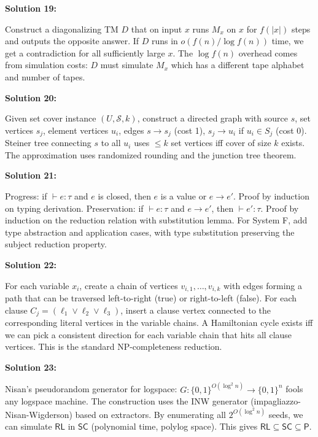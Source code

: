 \documentclass[12pt,a4paper]{exam}
\begin{document}
\vspace{0.5cm}

\textbf{Solution 19:}

Construct a diagonalizing TM $D$ that on input $x$ runs $M_x$ on $x$ for $f(|x|)$ steps and outputs the opposite answer. If $D$ runs in $o(f(n)/\log f(n))$ time, we get a contradiction for all sufficiently large $x$. The $\log f(n)$ overhead comes from simulation costs: $D$ must simulate $M_x$ which has a different tape alphabet and number of tapes.

\vspace{0.5cm}

\textbf{Solution 20:}

Given set cover instance $(U,\mathcal{S},k)$, construct a directed graph with source $s$, set vertices $s_j$, element vertices $u_i$, edges $s \to s_j$ (cost 1), $s_j \to u_i$ if $u_i \in S_j$ (cost 0). Steiner tree connecting $s$ to all $u_i$ uses $\leq k$ set vertices iff cover of size $k$ exists. The approximation uses randomized rounding and the junction tree theorem.

\vspace{0.5cm}

\textbf{Solution 21:}

Progress: if $\vdash e: \tau$ and $e$ is closed, then $e$ is a value or $e \to e'$. Proof by induction on typing derivation. Preservation: if $\vdash e: \tau$ and $e \to e'$, then $\vdash e': \tau$. Proof by induction on the reduction relation with substitution lemma. For System F, add type abstraction and application cases, with type substitution preserving the subject reduction property.

\vspace{0.5cm}

\textbf{Solution 22:}

For each variable $x_i$, create a chain of vertices $v_{i,1}, \ldots, v_{i,k}$ with edges forming a path that can be traversed left-to-right (true) or right-to-left (false). For each clause $C_j = (\ell_1 \lor \ell_2 \lor \ell_3)$, insert a clause vertex connected to the corresponding literal vertices in the variable chains. A Hamiltonian cycle exists iff we can pick a consistent direction for each variable chain that hits all clause vertices. This is the standard NP-completeness reduction.

\vspace{0.5cm}

\textbf{Solution 23:}

Nisan's pseudorandom generator for logspace: $G: \{0,1\}^{O(\log^2 n)} \to \{0,1\}^{n}$ fools any logspace machine. The construction uses the INW generator (impagliazzo-Nisan-Wigderson) based on extractors. By enumerating all $2^{O(\log^2 n)}$ seeds, we can simulate $\mathsf{RL}$ in $\mathsf{SC}$ (polynomial time, polylog space). This gives $\mathsf{RL} \subseteq \mathsf{SC} \subseteq \mathsf{P}$.
\end{document}
